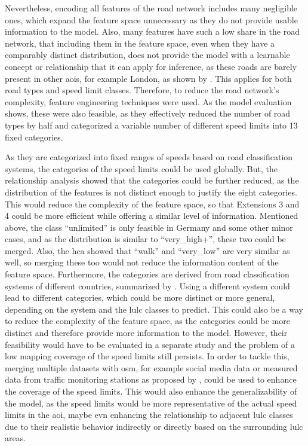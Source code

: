 Nevertheless, encoding all features of the road network includes many negligible ones, which expand the feature space unnecessary as they do not provide usable information to the model. Also, many features have such a low share in the road network, that including them in the feature space, even when they have a comparably distinct distribution, does not provide the model with a learnable concept or relationship that it can apply for inference, as these roads are barely present in other \glspl{aoi}, for example London, as shown by \textcite{Alghanim.Jilani.ea2021}. This applies for both road types and speed limit classes. Therefore, to reduce the road network's complexity, feature engineering techniques were used. As the model evaluation shows, these were also feasible, as they effectively reduced the number of road types by half and categorized a variable number of different speed limits into 13 fixed categories.

As they are categorized into fixed ranges of speeds based on road classification systems, the categories of the speed limits could be used globally. But, the relationship analysis showed that the categories could be further reduced, as the distribution of the features is not distinct enough to justify the eight categories. This would reduce the complexity of the feature space, so that Extensions 3 and 4 could be more efficient while offering a similar level of information. Mentioned above, the class \enquote{unlimited} is only feasible in Germany and some other minor cases, and as the distribution is similar to \enquote{very\_high+}, these two could be merged. Also, the \gls{hca} showed that \enquote{walk} and \enquote{very\_low} are very similar as well, so merging these too would not reduce the information content of the feature space. Furthermore, the categories are derived from road classification systems of different countries, summarized by \textcite{Vitkiene.Puodziukas.ea2017}. Using a different system could lead to different categories, which could be more distinct or more general, depending on the system and the \gls{lulc} classes to predict. This could also be a way to reduce the complexity of the feature space, as the categories could be more distinct and therefore provide more information to the model. However, their feasibility would have to be evaluated in a separate study and the problem of a low mapping coverage of the speed limits still persists. In order to tackle this, merging multiple datasets with \gls{osm}, for example social media data or measured data from traffic monitoring stations as proposed by \textcite{Camargo.Bright.ea2020,Ludwig.Psotta.ea2023}, could be used to enhance the coverage of the speed limits. This would also enhance the generalizability of the model, as the speed limits would be more representative of the actual speed limits in the \gls{aoi}, maybe evn enhancing the relationship to adjacent \gls{lulc} classes due to their realistic behavior indirectly or directly based on the surrounding \gls{lulc} areas.

